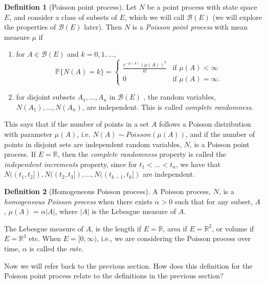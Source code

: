 \documentclass[11pt, oneside]{article}   	%
\theoremstyle{definition}
\newtheorem{definition}{Definition}[section]
\theoremstyle{remark}
\begin{document}
\begin{definition}[Poisson point process] \label{ppp}
  Let $N$ be a point process with state space $E$, and consider a class of subsets of $E$, which we will call $\mathcal{B}(E)$ (we will explore the properties of $\mathcal{B}(E)$ later). Then $N$ is a \textit{Poisson point process} with mean measure $\mu$ if
  \begin{enumerate}[label=(\roman*)]
    \item
      for $A\in\mathcal{B}(E)$ and $k = 0, 1,...,$
      $$\mathbb{P}\{N(A) = k\} = \begin{cases} \frac{e^{-\mu(A)}(\mu(A))^k}{k!} &\text{if } \mu(A)<\infty \\ 0 &\text{if } \mu(A)=\infty.\end{cases}$$
    \item for disjoint subsets $A_1,...,A_n$ in $\mathcal{B}(E)$ , the random variables, $N(A_1),...,N(A_n)$, are independent. This is called \textit{complete randomness}.
  \end{enumerate}
\end{definition}
This says that if the number of points in a set $A$ follows a Poisson distribution with parameter $\mu(A)$, i.e. $N(A) \sim \textit{Poisson}(\mu(A))$, and if the number of points in disjoint sets are independent random variables, $N$, is a Poisson point process. If $E=\mathbb{R}$, then the \textit{complete randomness} property is called the \textit{independent increments} property, since for $t_1 < ... < t_n$, we have that $N((t_1, t_2]), N((t_2, t_3]),..., N((t_{k-1}, t_k])$ are independent.

\begin{definition}[Homogeneous Poisson process]
  A Poisson process, $N$, is a \textit{homogeneous Poisson process} when there exists $\alpha > 0$ such that for any subset, $A$, $\mu(A)$ = $\alpha|A|$, where $|A|$ is the Lebesgue measure of $A$.
\end{definition}

The Lebesgue measure of $A$, is the length if $E=\mathbb{R}$, area if $E=\mathbb{R}^2$, or volume if $E=\mathbb{R}^3$ etc. When $E=[0,\infty)$, i.e., we are considering the Poisson process over time, $\alpha$ is called the \textit{rate}.

\vspace{5mm}

Now we will refer back to the previous section. How does this definition for the Poisson point process relate to the definitions in the previous section?
\end{document}
